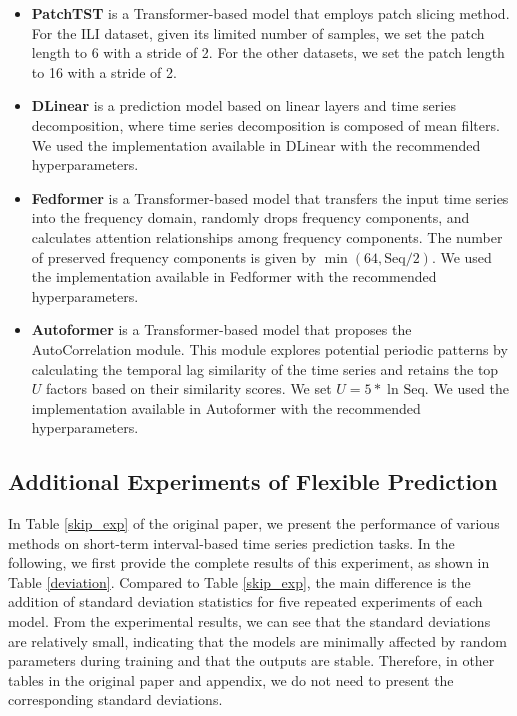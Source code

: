 \documentclass{article}
\begin{document}
\begin{itemize}
    \item [$\bullet$] \textbf{PatchTST}\cite{patchtst} is a Transformer-based model that employs patch slicing method. For the ILI dataset, given its limited number of samples, we set the patch length to 6 with a stride of 2. For the other datasets, we set the patch length to 16 with a stride of 2.

    \item [$\bullet$] \textbf{DLinear}\cite{dlinear} is a prediction model based on linear layers and time series decomposition, where time series decomposition is composed of mean filters. We used the implementation available in DLinear with the recommended hyperparameters.

    \item [$\bullet$] \textbf{Fedformer}\cite{fedformer} is a Transformer-based model that transfers the input time series into the frequency domain, randomly drops frequency components, and calculates attention relationships among frequency components. The number of preserved frequency components is given by $\min(64, \text{Seq}/2)$. We used the implementation available in Fedformer with the recommended hyperparameters.

    \item [$\bullet$] \textbf{Autoformer}\cite{autoformer} is a Transformer-based model that proposes the AutoCorrelation module. This module explores potential periodic patterns by calculating the temporal lag similarity of the time series and retains the top $U$ factors based on their similarity scores. We set $U = 5*\ln_{}{\text{Seq}}$. We used the implementation available in Autoformer with the recommended hyperparameters.
    
\end{itemize}











\subsection{Additional Experiments of Flexible Prediction}\label{flexible_prediction}

In Table \ref{skip_exp} of the original paper, we present the performance of various methods on short-term interval-based time series prediction tasks. In the following, we first provide the complete results of this experiment, as shown in Table \ref{deviation}.
Compared to Table \ref{skip_exp}, the main difference is the addition of standard deviation statistics for five repeated experiments of each model. 
From the experimental results, we can see that the standard deviations are relatively small, indicating that the models are minimally affected by random parameters during training and that the outputs are stable. 
Therefore, in other tables in the original paper and appendix, we do not need to present the corresponding standard deviations.
\end{document}
